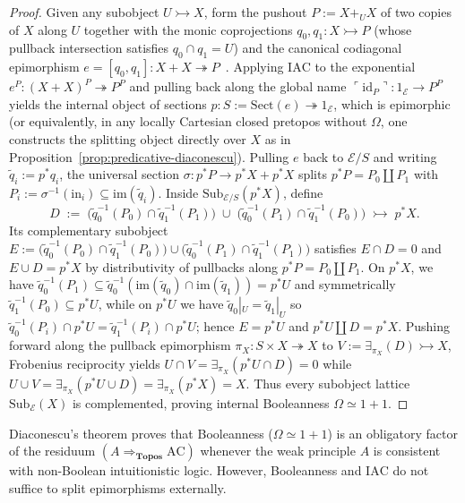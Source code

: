 \begin{proof}
Given any subobject $U \rightarrowtail X$, form the pushout $P := X +_U X$ of two copies of $X$ along $U$ together with the monic coprojections $q_0, q_1 : X \rightarrowtail P$ (whose pullback intersection satisfies $q_0 \cap q_1 = U$) and the canonical codiagonal epimorphism $e = [q_0, q_1] : X + X \twoheadrightarrow P$~\cite[\S D4.5, Thm.~D4.5.1]{Johnstone02}. Applying $\mathrm{IAC}$ to the exponential $e^P : (X + X)^P \twoheadrightarrow P^P$ and pulling back along the global name $\ulcorner \mathrm{id}_P \urcorner : 1_{\mathcal{E}} \to P^P$ yields the internal object of sections $p : S := \mathrm{Sect}(e) \twoheadrightarrow 1_{\mathcal{E}}$, which is epimorphic (or equivalently, in any locally Cartesian closed pretopos without $\Omega$, one constructs the splitting object directly over $X$ as in Proposition~\ref{prop:predicative-diaconescu}). Pulling $e$ back to $\mathcal{E}/S$ and writing $\tilde{q}_i := p^* q_i$, the universal section $\sigma : p^* P \to p^* X + p^* X$ splits $p^* P = P_0 \amalg P_1$ with $P_i := \sigma^{-1}(\mathrm{in}_i) \subseteq \mathrm{im}(\tilde{q}_i)$. Inside $\mathrm{Sub}_{\mathcal{E}/S}(p^* X)$, define
\[
  D \;:=\; \bigl(\tilde{q}_0^{-1}(P_0) \cap \tilde{q}_1^{-1}(P_1)\bigr) \;\cup\; \bigl(\tilde{q}_0^{-1}(P_1) \cap \tilde{q}_1^{-1}(P_0)\bigr) \;\rightarrowtail\; p^* X.
\]
Its complementary subobject $E := \bigl(\tilde{q}_0^{-1}(P_0) \cap \tilde{q}_1^{-1}(P_0)\bigr) \cup \bigl(\tilde{q}_0^{-1}(P_1) \cap \tilde{q}_1^{-1}(P_1)\bigr)$ satisfies $E \cap D = 0$ and $E \cup D = p^* X$ by distributivity of pullbacks along $p^* P = P_0 \amalg P_1$. On $p^* X$, we have $\tilde{q}_0^{-1}(P_1) \subseteq \tilde{q}_0^{-1}(\mathrm{im}(\tilde{q}_0) \cap \mathrm{im}(\tilde{q}_1)) = p^* U$ and symmetrically $\tilde{q}_1^{-1}(P_0) \subseteq p^* U$, while on $p^* U$ we have $\tilde{q}_0|_U = \tilde{q}_1|_U$ so $\tilde{q}_0^{-1}(P_i) \cap p^* U = \tilde{q}_1^{-1}(P_i) \cap p^* U$; hence $E = p^* U$ and $p^* U \amalg D = p^* X$. Pushing forward along the pullback epimorphism $\pi_X : S \times X \twoheadrightarrow X$ to $V := \exists_{\pi_X}(D) \rightarrowtail X$, Frobenius reciprocity yields $U \cap V = \exists_{\pi_X}(p^* U \cap D) = 0$ while $U \cup V = \exists_{\pi_X}(p^* U \cup D) = \exists_{\pi_X}(p^* X) = X$. Thus every subobject lattice $\mathrm{Sub}_{\mathcal{E}}(X)$ is complemented, proving internal Booleanness $\Omega \simeq 1 + 1$.
\end{proof}

Diaconescu's theorem proves that Booleanness ($\Omega \simeq 1+1$) is an obligatory factor of the residuum $(A \Rightarrow_{\mathbf{Topos}} \mathrm{AC})$ whenever the weak principle $A$ is consistent with non-Boolean intuitionistic logic. However, Booleanness and $\mathrm{IAC}$ do not suffice to split epimorphisms externally.


